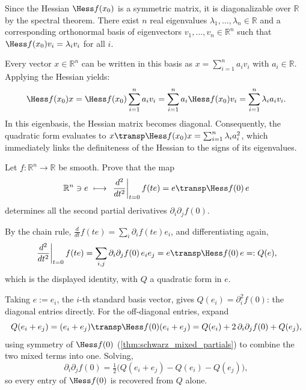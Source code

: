 \begin{remark}
\label{rem:diagonalizing_hessian}
Since the Hessian $\Hess f(x_0)$ is a symmetric matrix, it is diagonalizable over $\mathbb{R}$ by the spectral theorem. There exist $n$ real eigenvalues $\lambda_1, \dots, \lambda_n \in \mathbb{R}$ and a corresponding orthonormal basis of eigenvectors $v_1, \dots, v_n \in \mathbb{R}^n$ such that $\Hess f(x_0) v_i = \lambda_i v_i$ for all $i$.

Every vector $x \in \mathbb{R}^n$ can be written in this basis as $x = \sum_{i=1}^n a_i v_i$ with $a_i \in \mathbb{R}$. Applying the Hessian yields:
\[
  \Hess f(x_0) x = \Hess f(x_0) \sum_{i=1}^n a_i v_i = \sum_{i=1}^n a_i \Hess f(x_0) v_i = \sum_{i=1}^n \lambda_i a_i v_i.
\]
In this eigenbasis, the Hessian matrix becomes diagonal. Consequently, the quadratic form evaluates to $x\transp \Hess f(x_0) x = \sum_{i=1}^n \lambda_i a_i^2$, which immediately links the definiteness of the Hessian to the signs of its eigenvalues.
\end{remark}

\begin{exercise}
\label{ex:polarisation_formula}
Let $f : \mathbb{R}^n \to \mathbb{R}$ be smooth. Prove that the map
\[\mathbb{R}^n \ni e \ \longmapsto\ \left.\frac{d^2}{dt^2}\right|_{t=0} f(te) = e\transp \Hess f(0)\,e\]
determines all the second partial derivatives $\partial_i\partial_jf(0)$.
\end{exercise}

\begin{exercisesolution}
By the chain rule, $\tfrac{d}{dt}f(te) = \sum_i \partial_if(te)e_i$, and differentiating again,
\[\left.\frac{d^2}{dt^2}\right|_{t=0}f(te) = \sum_{i,j}\partial_i\partial_jf(0)\,e_ie_j
  = e\transp\Hess f(0)\,e =: Q(e),\]
which is the displayed identity, with $Q$ a quadratic form in $e$.

Taking $e := e_i$, the $i$-th standard basis vector, gives $Q(e_i) = \partial_i^2f(0)$: the
diagonal entries directly. For the off-diagonal entries, expand
\[Q(e_i+e_j) = (e_i+e_j)\transp\Hess f(0)(e_i+e_j)
  = Q(e_i) + 2\,\partial_i\partial_jf(0) + Q(e_j),\]
using symmetry of $\Hess f(0)$ (\cref{thm:schwarz_mixed_partials}) to combine the two mixed
terms into one. Solving,
\[\partial_i\partial_jf(0) = \tfrac12\big(Q(e_i+e_j) - Q(e_i) - Q(e_j)\big),\]
so every entry of $\Hess f(0)$ is recovered from $Q$ alone.
\end{exercisesolution}

